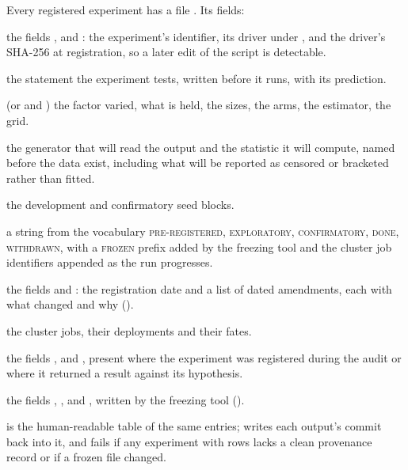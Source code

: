 Every registered experiment has a file . Its fields:
\begin{description}[leftmargin=2em,itemsep=0.2em]
\item[identity] the fields ,  and : the experiment's identifier, its
  driver under , and the driver's SHA-256 at registration, so a later
  edit of the script is detectable.
\item[\code{hypothesis}] the statement the experiment tests, written before it runs, with
  its prediction.
\item[\code{design}] (or  and ) the factor varied, what is
  held, the sizes, the arms, the estimator, the grid.
\item[\code{predeclared\_analysis}] the generator that will read the output and the
  statistic it will compute, named before the data exist, including what will be
  reported as censored or bracketed rather than fitted.
\item[\code{seeds}] the development and confirmatory seed blocks.
\item[\code{status}] a string from the vocabulary \textsc{pre-registered},
  \textsc{exploratory}, \textsc{confirmatory}, \textsc{done}, \textsc{withdrawn}, with a
  \textsc{frozen} prefix added by the freezing tool and the cluster job identifiers
  appended as the run progresses.
\item[history] the fields  and : the registration date and a list of dated
  amendments, each with what changed and why ().
\item[\code{hpc\_runs}] the cluster jobs, their deployments and their fates.
\item[free text] the fields ,  and , present where the
  experiment was registered during the audit or where it returned a result against its
  hypothesis.
\item[freeze record] the fields , ,
   and , written by the freezing tool
  ().
\end{description}
 is the human-readable table of the same entries;
 writes each output's commit back into it, and
 fails if any experiment with rows lacks a clean provenance record or if a
frozen file changed.


